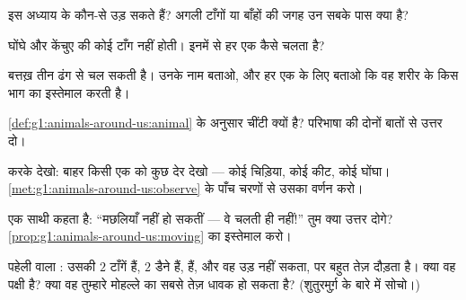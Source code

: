\begin{exercise}[$\star$]\label{exo:g1:animals-around-us:4}
इस अध्याय के कौन-से  उड़ सकते हैं? अगली टाँगों या बाँहों की जगह
उन सबके पास क्या है?
\end{exercise}

\begin{exercise}[$\star$]\label{exo:g1:animals-around-us:5}
घोंघे और केंचुए की कोई टाँग नहीं होती। इनमें से हर एक कैसे चलता है?
\end{exercise}

\begin{exercise}[$\star$]\label{exo:g1:animals-around-us:6}
बत्तख़ तीन ढंग से चल सकती है। उनके नाम बताओ, और हर एक के लिए बताओ कि
वह शरीर के किस भाग का इस्तेमाल करती है।
\end{exercise}

\begin{exercise}[$\star$]\label{exo:g1:animals-around-us:7}
\cref{def:g1:animals-around-us:animal} के अनुसार चींटी  क्यों है?
परिभाषा की दोनों बातों से उत्तर दो।
\end{exercise}

\begin{exercise}[$\star$]\label{exo:g1:animals-around-us:8}
करके देखो: बाहर किसी एक  को कुछ देर देखो --- कोई चिड़िया, कोई
कीट, कोई घोंघा। \cref{met:g1:animals-around-us:observe} के पाँच चरणों
से उसका वर्णन करो।
\end{exercise}

\begin{exercise}[$\star\star$]\label{exo:g1:animals-around-us:9}
एक साथी कहता है: ``मछलियाँ  नहीं हो सकतीं --- वे चलती ही नहीं!''
तुम क्या उत्तर दोगे? \cref{prop:g1:animals-around-us:moving} का
इस्तेमाल करो।
\end{exercise}

\begin{exercise}[$\star\star$]\label{exo:g1:animals-around-us:10}
पहेली वाला : उसकी $2$ टाँगें हैं, $2$ डैने हैं,  हैं, और वह
उड़ नहीं सकता, पर बहुत तेज़ दौड़ता है। क्या वह पक्षी है? क्या वह
तुम्हारे मोहल्ले का सबसे तेज़ धावक हो सकता है? (शुतुरमुर्ग़ के बारे
में सोचो।)
\end{exercise}
